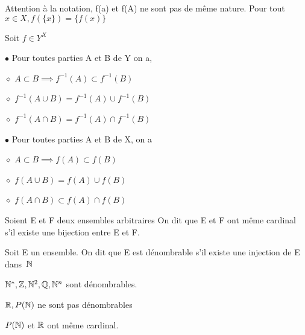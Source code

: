 \documentclass[a4paper, 12pt]{article}
\begin{document}
\begin{remark}
    Attention à la notation, f(a) et f(A) ne sont pas de même nature.
    Pour tout $x \in X, f(\{x\}) = \{f(x)\}$
\end{remark}

\begin{theorem}
    Soit $f \in Y^X$

    \item $\bullet$ Pour toutes parties A et B de Y on a,
    
    \item $\diamond$ $A \subset B \implies f^{-1}(A) \subset f^{-1}(B)$

    \item $\diamond$ $f^{-1}(A \cup B) = f^{-1}(A) \cup f^{-1}(B)$
    
    \item $\diamond$ $f^{-1}(A \cap B) = f^{-1}(A) \cap f^{-1}(B)$
    
    \item $\bullet$ Pour toutes parties A et B de X, on a
    
    \item $\diamond$ $A \subset B \implies f(A) \subset f(B)$
    \item $\diamond$ $f(A \cup B) = f(A) \cup f(B)$
    \item $\diamond$ $f(A \cap B) \subset f(A) \cap f(B)$
\end{theorem}

\begin{demonstration}
\end{demonstration}








\begin{definition}
    Soient E et F deux ensembles arbitraires On dit que E et F ont même cardinal
    s'il existe une bijection entre E et F.

    Soit E un ensemble. On dit que E est dénombrable s'il existe une injection de E dans~$\mathbb{N}$
\end{definition}

\begin{proposition}
    $\mathbb{N}^*, \mathbb{Z}, \mathbb{N}^2, \mathbb{Q}, \mathbb{N}^n$ sont dénombrables.

    $\mathbb{R}, P(\mathbb{N})$ ne sont pas dénombrables

    $P(\mathbb{N})$ et $\mathbb{R}$ ont même cardinal.

\end{proposition}
\end{document}
